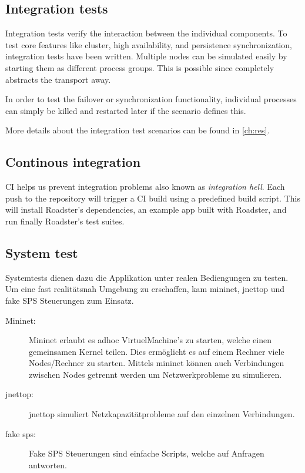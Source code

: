 \subsection{Integration tests}
Integration tests verify the interaction between the individual components.
To test core features like cluster, high availability, and persistence
synchronization, integration tests have been written. Multiple nodes can be
simulated easily by starting them as different process groups. This is possible
since \zmq completely abstracts the transport away.

In order to test the failover or synchronization functionality, individual processes
can simply be killed and restarted later if the scenario defines this.

More details about the integration test scenarios can be found in \autoref{ch:res}.

\subsection{Continous integration}
\gls{CI} helps us prevent integration problems also known as \emph{integration
hell}. Each push to the repository will trigger a CI build using a predefined
build script. This will install Roadster's dependencies, an example app built
with Roadster, and run finally Roadster's test suites.

\subsection{System test}
Systemtests dienen dazu die Applikation unter realen Bediengungen zu testen. Um eine fast realitätsnah
Umgebung zu erschaffen, kam mininet, jnettop und fake SPS Steuerungen zum Einsatz.
\begin{description}
	\item [Mininet:]
		Mininet erlaubt es adhoc VirtuelMachine's zu starten, 
		welche einen gemeinsamen Kernel teilen.
		Dies ermöglicht es auf einem Rechner viele Nodes/Rechner zu starten. 
		Mittels mininet können auch Verbindungen zwischen Nodes getrennt werden
		um Netzwerkprobleme zu simulieren. 
	\item [jnettop:]
		jnettop simuliert Netzkapazitätprobleme auf den einzelnen Verbindungen.
	\item [fake sps:]
		Fake SPS Steuerungen sind einfache Scripts, welche auf Anfragen antworten.
\end{description}

